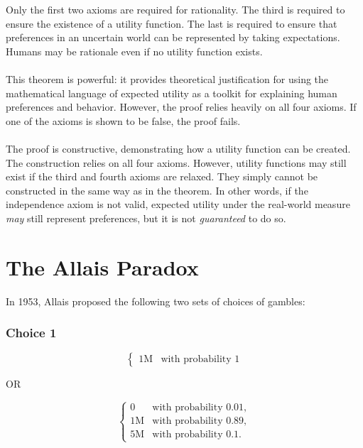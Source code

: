 \documentclass{article}
\begin{document}
Only the first two axioms are required for rationality.  The third is required to ensure the existence of a utility function.  The last is required to ensure that preferences in an uncertain world can be represented by taking expectations.  Humans may be rationale even if no utility function exists.  
\\
\\
This theorem is powerful: it provides theoretical justification for using the mathematical language of expected utility as a toolkit for explaining human preferences and behavior.  However, the proof relies heavily on all four axioms.  If one of the axioms is shown to be false, the proof fails.  
\\
\\
The proof is constructive, demonstrating how a utility function can be created.  The construction relies on all four axioms.  However, utility functions may still exist if the third and fourth axioms are relaxed.  They simply cannot be constructed in the same way as in the theorem.  In other words, if the independence axiom is not valid, expected utility under the real-world measure \emph{may} still represent preferences, but it is not \emph{guaranteed} to do so.  
 

\section{The Allais Paradox} 

In 1953, Allais proposed the following two sets of choices of gambles:

\subsubsection{Choice 1}

\begin{equation*}
\left\{
\begin{array}{rl}
1\text{M} & \text{with probability } 1
\end{array} \right.
\end{equation*}

OR

\begin{equation*}
\left\{
\begin{array}{rl}
0 & \text{with probability } 0.01,
\\1\text{M} & \text{with probability } 0.89,
\\5\text{M} & \text{with probability } 0.1.
\end{array} \right.
\end{equation*}
\end{document}
